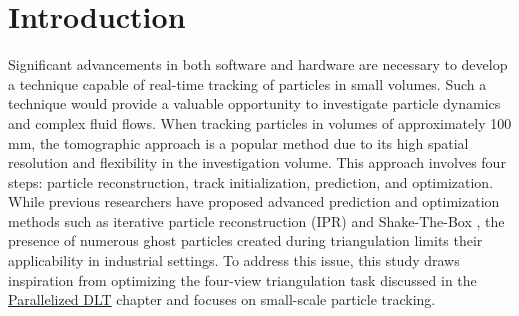 \documentclass[draftthesis,fullpage]{uiucthesis}
\begin{document}


\chapter{Introduction}\label{chapter:intro}

Significant advancements in both software and hardware are necessary to develop a technique capable of real-time tracking of particles in small volumes. Such a technique would provide a valuable opportunity to investigate particle dynamics and complex fluid flows. When tracking particles in volumes of approximately 100 mm, the tomographic approach is a popular method due to its high spatial resolution and flexibility in the investigation volume. This approach involves four steps: particle reconstruction, track initialization, prediction, and optimization. While previous researchers have proposed advanced prediction and optimization methods such as iterative particle reconstruction  (IPR) \citep{wieneke2012iterative} and Shake-The-Box \citep{schanz2016shake}, the presence of numerous ghost particles created during triangulation limits their applicability in industrial settings. To address this issue, this study draws inspiration from optimizing the four-view triangulation task discussed in the \hyperref[chapter:DLT]{Parallelized DLT} chapter and focuses on small-scale particle tracking.
\end{document}
